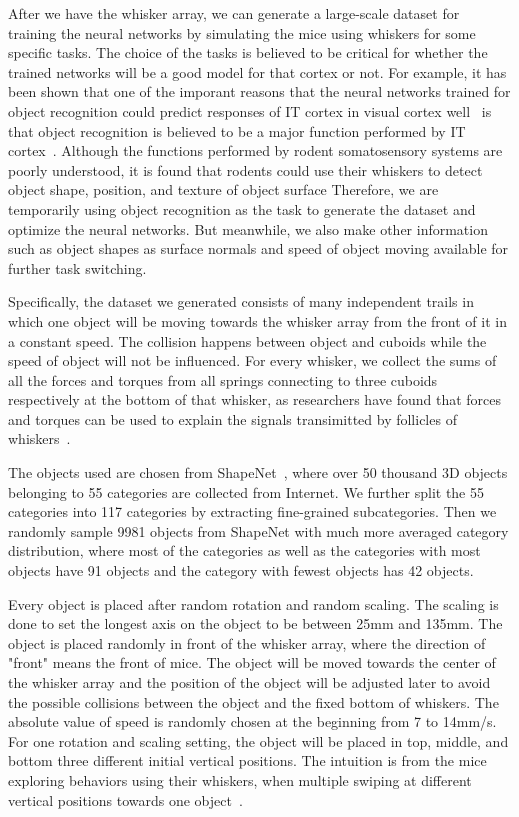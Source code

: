 After we have the whisker array, we can generate a large-scale dataset for training the neural networks by simulating the mice using whiskers for some specific tasks.
The choice of the tasks is believed to be critical for whether the trained networks will be a good model for that cortex or not.
For example, it has been shown that one of the imporant reasons that the neural networks trained for object recognition could predict responses of IT cortex in visual cortex well~\cite{cadieu2014deep, Yamins2014} is that object recognition is believed to be a major function performed by IT cortex~\cite{hung2005fast, yamins2016using}.
Although the functions performed by rodent somatosensory systems are poorly understood, it is found that rodents could use their whiskers to detect object shape, position, and texture of object surface\cite{Boubenec2012,Diamond2008,Arabzadeh2005,OConnor2010}
Therefore, we are temporarily using object recognition as the task to generate the dataset and optimize the neural networks.
But meanwhile, we also make other information such as object shapes as surface normals and speed of object moving available for further task switching.

Specifically, the dataset we generated consists of many independent trails in which one object will be moving towards the whisker array from the front of it in a constant speed.
The collision happens between object and cuboids while the speed of object will not be influenced.
For every whisker, we collect the sums of all the forces and torques from all springs connecting to three cuboids respectively at the bottom of that whisker, as researchers have found that forces and torques can be used to explain the signals transimitted by follicles of whiskers~\cite{Quist2014, Huet2016}.

The objects used are chosen from ShapeNet~\cite{Chang2015}, where over 50 thousand 3D objects belonging to 55 categories are collected from Internet.
We further split the 55 categories into 117 categories by extracting fine-grained subcategories.
Then we randomly sample 9981 objects from ShapeNet with much more averaged category distribution, where most of the categories as well as the categories with most objects have 91 objects and the category with fewest objects has 42 objects.

Every object is placed after random rotation and random scaling. The scaling is done to set the longest axis on the object to be between 25mm and 135mm. The object is placed randomly in front of the whisker array, where the direction of "front" means the front of mice.
The object will be moved towards the center of the whisker array and the position of the object will be adjusted later to avoid the possible collisions between the object and the fixed bottom of whiskers.
The absolute value of speed is randomly chosen at the beginning from 7 to 14mm/s.
For one rotation and scaling setting, the object will be placed in top, middle, and bottom three different initial vertical positions. The intuition is from the mice exploring behaviors using their whiskers, when multiple swiping at different vertical positions towards one object~\cite{hobbs2015spatiotemporal}.

